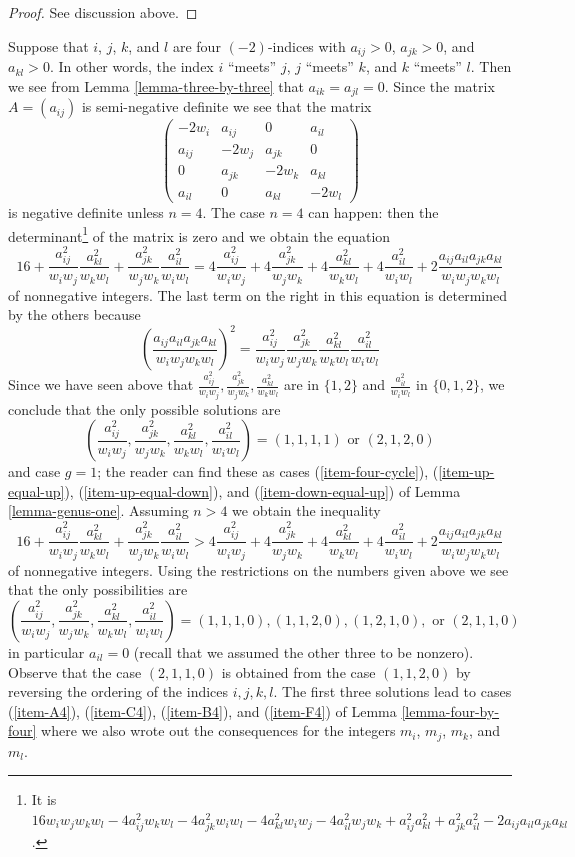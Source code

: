 \documentclass{stacks-project}
\theoremstyle{plain}
\theoremstyle{definition}
\theoremstyle{remark}
\numberwithin{equation}{subsection}
\begin{document}
\begin{proof}
See discussion above.
\end{proof}

\noindent
Suppose that $i$, $j$, $k$, and $l$ are four $(-2)$-indices with
$a_{ij} > 0$, $a_{jk} > 0$, and $a_{kl} > 0$. In other words, the
index $i$ ``meets'' $j$, $j$ ``meets'' $k$, and $k$ ``meets'' $l$.
Then we see from Lemma \ref{lemma-three-by-three} that $a_{ik} = a_{jl} = 0$.
Since the matrix $A = (a_{ij})$ is semi-negative definite we see that the
matrix
$$
\left(
\begin{matrix}
-2w_i & a_{ij} & 0 & a_{il} \\
a_{ij} & -2w_j & a_{jk} & 0 \\
0 & a_{jk} & -2w_k & a_{kl} \\
a_{il} & 0 & a_{kl} & -2w_l
\end{matrix}
\right)
$$
is negative definite unless $n = 4$. The case $n = 4$ can happen:
then the determinant\footnote{It is
$16w_iw_jw_kw_l - 4a_{ij}^2w_kw_l - 4a_{jk}^2w_iw_l - 4a_{kl}^2w_iw_j -
4a_{il}^2w_jw_k + a_{ij}^2a_{kl}^2 + a_{jk}^2a_{il}^2 -
2a_{ij}a_{il}a_{jk}a_{kl}$.} of the matrix is zero and we obtain the equation
$$
16 +
\frac{a_{ij}^2}{w_iw_j}\frac{a_{kl}^2}{w_kw_l} +
\frac{a_{jk}^2}{w_jw_k}\frac{a_{il}^2}{w_iw_l} =
4\frac{a_{ij}^2}{w_iw_j} + 4\frac{a_{jk}^2}{w_jw_k} + 4\frac{a_{kl}^2}{w_kw_l}
+ 4\frac{a_{il}^2}{w_iw_l} + 2\frac{a_{ij}a_{il}a_{jk}a_{kl}}{w_iw_jw_kw_l}
$$
of nonnegative integers. The last term on the right in this equation is
determined by the others because
$$
\left(\frac{a_{ij}a_{il}a_{jk}a_{kl}}{w_iw_jw_kw_l}\right)^2 =
\frac{a_{ij}^2}{w_iw_j} \frac{a_{jk}^2}{w_jw_k}
\frac{a_{kl}^2}{w_kw_l} \frac{a_{il}^2}{w_iw_l}
$$
Since we have seen above that
$\frac{a_{ij}^2}{w_iw_j}, \frac{a_{jk}^2}{w_jw_k}, \frac{a_{kl}^2}{w_kw_l}$
are in $\{1, 2\}$ and $\frac{a_{il}^2}{w_iw_l}$ in $\{0, 1, 2\}$,
we conclude that the only possible solutions are
$$
(\frac{a_{ij}^2}{w_iw_j}, \frac{a_{jk}^2}{w_jw_k}, \frac{a_{kl}^2}{w_kw_l},
\frac{a_{il}^2}{w_iw_l}) =
(1, 1, 1, 1) \text{ or } (2, 1, 2, 0)
$$
and case $g = 1$; the reader can find these as cases
(\ref{item-four-cycle}), (\ref{item-up-equal-up}),
(\ref{item-up-equal-down}), and (\ref{item-down-equal-up})
of Lemma \ref{lemma-genus-one}. Assuming $n > 4$
we obtain the inequality
$$
16 +
\frac{a_{ij}^2}{w_iw_j}\frac{a_{kl}^2}{w_kw_l} +
\frac{a_{jk}^2}{w_jw_k}\frac{a_{il}^2}{w_iw_l} >
4\frac{a_{ij}^2}{w_iw_j} + 4\frac{a_{jk}^2}{w_jw_k} + 4\frac{a_{kl}^2}{w_kw_l}
+ 4\frac{a_{il}^2}{w_iw_l} + 2\frac{a_{ij}a_{il}a_{jk}a_{kl}}{w_iw_jw_kw_l}
$$
of nonnegative integers. Using the restrictions on the numbers given above
we see that the only possibilities are
$$
(\frac{a_{ij}^2}{w_iw_j}, \frac{a_{jk}^2}{w_jw_k}, \frac{a_{kl}^2}{w_kw_l},
\frac{a_{il}^2}{w_iw_l}) =
(1, 1, 1, 0), (1, 1, 2, 0), (1, 2, 1, 0), \text{ or }(2, 1, 1, 0)
$$
in particular $a_{il} = 0$ (recall that we assumed the other three
to be nonzero). Observe that the case $(2, 1, 1, 0)$ is obtained
from the case $(1, 1, 2, 0)$ by reversing the ordering
of the indices $i, j, k, l$. The first three solutions lead
to cases (\ref{item-A4}), (\ref{item-C4}), (\ref{item-B4}), and
(\ref{item-F4}) of Lemma \ref{lemma-four-by-four}
where we also wrote out the consequences for the integers $m_i$, $m_j$, $m_k$,
and $m_l$.
\end{document}
